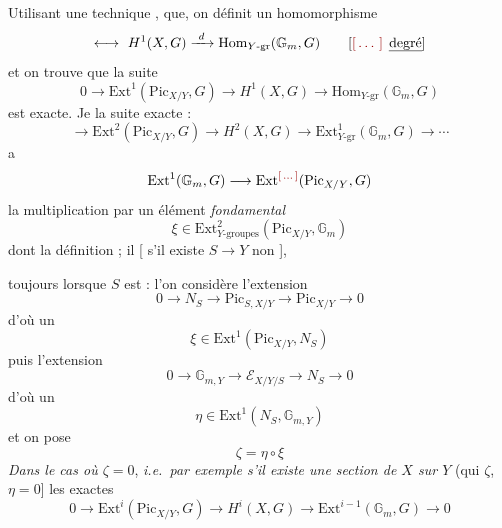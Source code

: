 \documentclass[11pt,a4paper]{article}
\begin{document}
Utilisant une technique  \ill{} \ill{}, 
 que, on  définit \ill{} \ill{} un
homomorphisme
\[
\longleftrightarrow\ H^1(X, G) \xrightarrow{\ d\ } \mathrm{Hom}_{Y\text{-gr}}(\mathbb{G}_m, G)
\qquad \text{[\ill{} \emph{degré}]}
\]
et on trouve que la suite
\[
\boxed{0 \to \mathrm{Ext}^1(\mathrm{Pic}_{X/Y}, G) \to H^1(X, G) \to \mathrm{Hom}_{Y\text{-gr}}(\mathbb{G}_m, G)}
\]
est exacte. Je    \ill{}
\ill{} \ill{} la suite exacte   :
\[
\boxed{\to \mathrm{Ext}^2(\mathrm{Pic}_{X/Y}, G) \to H^2(X, G) \to \mathrm{Ext}^1_{Y\text{-gr}}(\mathbb{G}_m, G) \to \cdots}
\]
\ill{} a \ill{} \ill{} \ill{}
\[
\mathrm{Ext}^1(\mathbb{G}_m, G) \longrightarrow \mathrm{Ext}^{\ill{}}(\mathrm{Pic}_{X/Y}, G)
\]
\ill{} la multiplication par un élément \emph{fondamental}
\[
\xi \in \mathrm{Ext}^2_{Y\text{-groupes}}(\mathrm{Pic}_{X/Y}, \mathbb{G}_m)
\]
dont la définition \ill{} \ill{} \ill{} \ill{} ; il \ill{} \ill{}
\ill{} [ s'il existe \ill{} $S \to Y$ non
],

 toujours  lorsque $S$ est
 : l'on considère l'extension
\[
0 \to N_S \longrightarrow \mathrm{Pic}_{S, X/Y} \longrightarrow \mathrm{Pic}_{X/Y} \to 0
\]
d'où un
\[
\xi \in \mathrm{Ext}^1(\mathrm{Pic}_{X/Y}, N_S)
\]
puis l'extension
\[
0 \to \mathbb{G}_{m,Y} \longrightarrow \mathcal{E}_{X/Y/S} \longrightarrow N_S \to 0
\]
d'où un
\[
\eta \in \mathrm{Ext}^1(N_S, \mathbb{G}_{m,Y})
\]
et on pose
\[
\zeta = \eta \circ \xi
\]
\emph{Dans le cas où $\zeta = 0$}, \emph{i.e.\ par exemple s'il existe une
section de $X$ sur $Y$} (qui \ill{} \ill{} \ill{} \ill{} $\zeta$, \ill{}
\ill{} \ill{} \ill{} \ill{} $\eta = 0$] \ill{} \ill{} \ill{} \ill{} les
 exactes  
\[
\boxed{0 \to \mathrm{Ext}^{i}(\mathrm{Pic}_{X/Y}, G) \to H^{i}(X, G) \to \mathrm{Ext}^{i-1}(\mathbb{G}_m, G) \to 0}
\]
\end{document}
